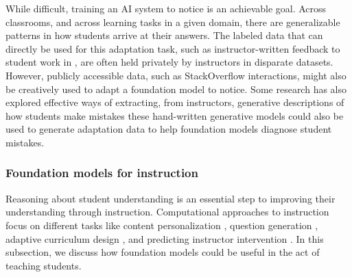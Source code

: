 While difficult, training an AI system to notice is an achievable goal. Across classrooms, and across learning tasks in a given domain, there are generalizable patterns in how students arrive at their answers. The labeled data that can directly be used for this adaptation task, such as instructor-written feedback to student work in \citep{wu2021prototransf}, are often held privately by instructors in disparate datasets. However,  publicly accessible data, such as StackOverflow interactions, might also be creatively used to adapt a foundation model to notice. Some research has also explored  effective ways of extracting, from instructors, generative descriptions of how students make mistakes \cite{malik2021generative, gulwani2013automated}\dash{}these hand-written generative models could also be used to generate adaptation data to help foundation models diagnose student mistakes.





\subsubsection{Foundation models for instruction}

Reasoning about student understanding is an essential step to improving their understanding through instruction. 
Computational approaches to instruction focus on different tasks like content personalization \citep{connor2019using}, question generation \cite{Guo2016questimator, willis2019keyphrase, srivastava2021question}, adaptive curriculum design \cite{mandel2014rleducgames, doroudi2017robusevalmatrix}, and predicting instructor intervention \cite{chandrasekaran2019reply, alrajhi2021urgency}. In this subsection, we discuss how foundation models could be useful in the act of teaching students. 

